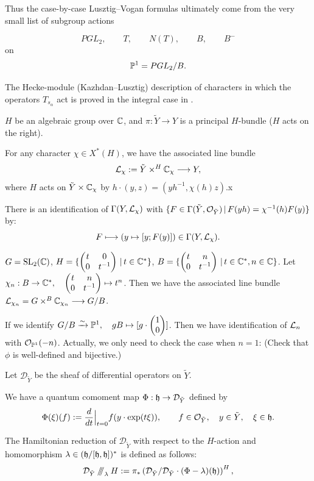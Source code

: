 Thus the case-by-case Lusztig--Vogan formulas ultimately come from the
very small list of subgroup actions

\[
PGL_2,\qquad
T,\qquad
N(T),\qquad
B,\qquad
B^-
\]
on
\[
\mathbb{P}^1=PGL_2/B.
\]

The Hecke-module (Kazhdan--Lusztig) description of characters in which the
operators $T_{s_\alpha}$ act is proved in the integral case in
\cite{Vogan1983}.





$H$ be an algebraic group over $\mathbb{C}$, and $\pi: \tilde{Y} \to Y$ is a principal $H$-bundle ($H$ acts on the right). 

For any character $\chi \in X^*(H)$, we have the associated line bundle
\[
  \mathcal{L}_\chi := \tilde{Y} \times^H \mathbb{C}_\chi \longrightarrow Y,
\]
where $H$ acts on $\tilde{Y} \times \mathbb{C}_{\chi}$ by $h \cdot (y, z) = (yh^{-1}, \chi(h)z)$.x

There is an identification of $\Gamma(Y,\mathcal{L}_{\chi})$ with $\{F \in \Gamma(\tilde{Y},\mathcal{O}_{\tilde{Y}})\,|\,F(yh) = \chi^{-1}(h)F(y)\}$ by:
\[
  F \longmapsto (y \mapsto [y ; F(y)]) \in \Gamma(Y,\mathcal{L}_{\chi}).
\]

\begin{examp}
  $G = \operatorname{SL}_2(\mathbb{C})$, $H = \{\begin{pmatrix} t & 0\\ 0 & t^{-1} \end{pmatrix}\,|\,t \in \mathbb{C}^*\}$, $B = \{\begin{pmatrix} t & n\\ 0 & t^{-1} \end{pmatrix}\,|\,t \in \mathbb{C}^*, n \in \mathbb{C}\}$.
  Let $\chi_n: B \to \mathbb{C}^*, \quad \begin{pmatrix} t & n\\ 0 & t^{-1} \end{pmatrix} \mapsto t^n$. Then we have the associated line bundle $\mathcal{L}_{\chi_n} = G \times^B \mathbb{C}_{\chi_n} \longrightarrow G/B$.
  
  If we identify $G/B \xrightarrow{\sim} \mathbb{P}^1, \quad gB \mapsto [g \cdot \begin{pmatrix} 1\\ 0 \end{pmatrix}]$.
  Then we have identification of $\mathcal{L}_n$ with $\mathcal{O}_{\mathbb{P}^1}(-n)$. Actually, we only need to check the case when $n=1$:
  (Check that $\phi$ is well-defined and bijective.)
\end{examp}



Let $\mathcal{D}_{\tilde{Y}}$ be the sheaf of differential operators on $\tilde{Y}$. 

We have a quantum comoment map $\Phi: \mathfrak{h} \to \mathcal{D}_{\tilde{Y}}$ defined by 
\[
  \Phi(\xi)(f) := \frac{d}{dt}\Big|_{t=0} f(y \cdot \exp(t\xi)), \qquad f \in \mathcal{O}_{\tilde{Y}}, \quad y \in \tilde{Y}, \quad \xi \in \mathfrak{h}.
\]

The Hamiltonian reduction of $\mathcal{D}_{\tilde{Y}}$ with respect to the $H$-action and homomorphism $\lambda \in (\mathfrak{h}/[\mathfrak{h},\mathfrak{h}])^*$ is defined as follows:
\[
\mathcal{D}_{\tilde{Y}} \mathbin{/\mkern-6mu/\mkern-6mu/}_{\lambda} H := \pi_* \left( \mathcal{D}_{\tilde{Y}} / \mathcal{D}_{\tilde{Y}} \cdot (\Phi - \lambda)(\mathfrak{h}) \right)^H,
\]

